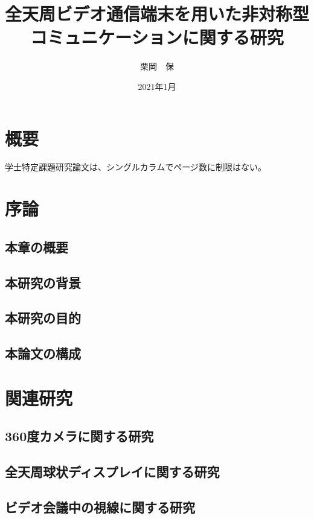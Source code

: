 \documentclass[11pt,oneside,openany,report]{jsbook}
\title{全天周ビデオ通信端末を用いた非対称型コミュニケーションに関する研究}
\author{栗岡　保}
\affiliation{東京工業大学\\情報理工学院\\情報工学系}
\date{2021年1月}
\begin{document}
\frontmatter
\maketitle

\chapter{概要}
学士特定課題研究論文は、シングルカラムでページ数に制限はない。

\tableofcontents
\listoffigures
\listoftables


\mainmatter
\chapter{序論}

\section{本章の概要}
\section{本研究の背景}
\section{本研究の目的}
\section{本論文の構成}

\chapter{関連研究}
\section{360度カメラに関する研究}
\section{全天周球状ディスプレイに関する研究}
\section{ビデオ会議中の視線に関する研究}
\end{document}
